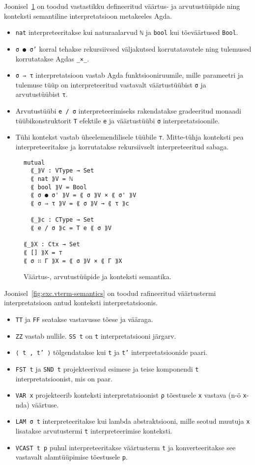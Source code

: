 \documentclass[a4paper,12pt]{article}
\begin{document}
Joonisel~\ref{fig:type-semantics} on toodud vastastikku defineeritud väärtus- ja arvutustüüpide ning konteksti semantiline interpretatsioon metakeeles Agda.
\begin{itemize}
\item {\tt nat} interpreteeritakse kui naturaalarvud {\tt ℕ} ja {\tt bool} kui tõeväärtused {\tt Bool}.
\item {\tt σ ● σ'} korral tehakse rekursiivsed väljakutsed korrutatavatele ning tulemused korrutatakse Agdas {\tt _×_}.
\item {\tt σ ⇒ τ} interpretatsioon vastab Agda funktsiooniruumile, mille parameetri ja tulemuse tüüp on interpreteeritud vastavalt väärtustüübist {\tt σ} ja arvutustüübist {\tt τ}.
\item Arvutustüübi {\tt e / σ} interpreteerimiseks rakendatakse gradeeritud monaadi tüübikonstruktorit {\tt T} efektile {\tt e} ja väärtustüübi {\tt σ} interpretatsioonile.
\item Tühi kontekst vastab üheelemendilisele tüübile {\tt ⊤}. Mitte-tühja konteksti pea interpreteeritakse ja korrutatakse rekursiivselt interpreteeritud sabaga.
\end{itemize}

\begin{figure}
  \begin{BVerbatim}
mutual
  ⟪_⟫V : VType → Set
  ⟪ nat ⟫V = ℕ
  ⟪ bool ⟫V = Bool
  ⟪ σ ● σ' ⟫V = ⟪ σ ⟫V × ⟪ σ' ⟫V
  ⟪ σ ⇒ τ ⟫V = ⟪ σ ⟫V → ⟪ τ ⟫c

  ⟪_⟫c : CType → Set
  ⟪ e / σ ⟫c = T e ⟪ σ ⟫V

⟪_⟫X : Ctx → Set
⟪ [] ⟫X = ⊤
⟪ σ ∷ Γ ⟫X = ⟪ σ ⟫V × ⟪ Γ ⟫X
  \end{BVerbatim}
  \caption{Väärtus-, arvutustüüpide ja konteksti semantika.}
  \label{fig:type-semantics}
\end{figure}

Joonisel~\ref{fig:exc.vterm-semantics} on toodud rafineeritud väärtustermi interpretatsioon antud konteksti interpretatsioonis.
\begin{itemize}
\item {\tt TT} ja {\tt FF} seatakse vastavusse tõese ja vääraga.
\item {\tt ZZ} vastab nullile. {\tt SS t} on {\tt t} interpretatsiooni järgarv.
\item {\tt ⟨ t , t' ⟩} tõlgendatakse kui {\tt t} ja {\tt t'} interpretatsioonide paari.
\item {\tt FST t} ja {\tt SND t} projekteerivad esimese ja teise komponendi {\tt t} interpretatsioonist, mis on paar.
\item {\tt VAR x} projekteerib konteksti interpretatsioonist {\tt ρ} tõestusele {\tt x} vastava (n-ö {\tt x}-nda) väärtuse.
\item {\tt LAM σ t} interpreteeritakse kui lambda abstraktsiooni, mille seotud muutuja {\tt x} lisatakse arvutustermi {\tt t} interpreteerimise konteksti.
\item {\tt VCAST t p} puhul interpreteeritakse väärtusterm {\tt t} ja konverteeritakse see vastavalt alamtüüpimise tõestusele {\tt p}.
\end{itemize}
\end{document}
